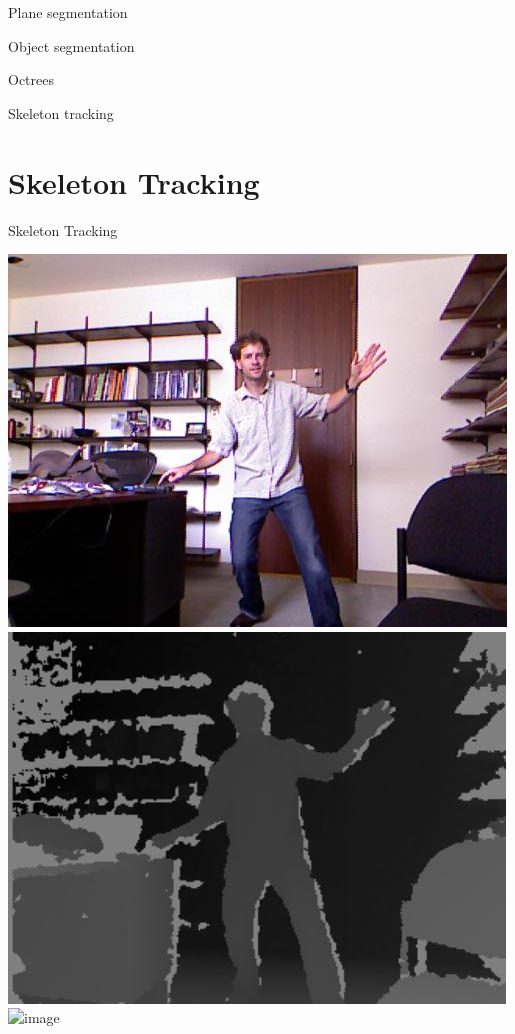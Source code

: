 \documentclass[compress]{beamer}
\begin{document}
\begin{frame}{Plane segmentation}
\end{frame}

\begin{frame}{Object segmentation}
\end{frame}

\begin{frame}{Octrees}

\end{frame}

\begin{frame}{Skeleton tracking}
\end{frame}



\section{Skeleton Tracking}


{
    \begin{frame}{Skeleton Tracking}

        \begin{center}
            \includegraphics[width=0.3\linewidth]{skeleton/skel3}
            \includegraphics[width=0.3\linewidth]{skeleton/skel2}
            \includegraphics<2>[width=0.3\linewidth]{skeleton/skel1}
        \end{center}
\end{frame}
}
\end{document}
